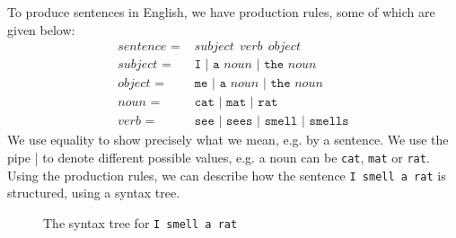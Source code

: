 \documentclass[a4paper, openany]{memoir}
\begin{document}
To produce sentences in English, we have production rules, some of which are given below:
\begin{align*}
    \textit{sentence } =& \textit{ subject} \ \ \textit{verb} \ \ \textit{object} \\
    \textit{subject } =& \texttt{ I } | \texttt{ a } \textit{noun } | \texttt{ the } \textit{noun } \\
    \textit{object } =& \texttt{ me } | \texttt{ a } \textit{noun } | \texttt{ the } \textit{noun } \\
    \textit{noun } =& \texttt{ cat } | \texttt{ mat } | \texttt{ rat} \\
    \textit{verb } =&  \texttt{ see } | \texttt{ sees } | \texttt{ smell } | \texttt{ smells}
\end{align*}
We use equality to show precisely what we mean, e.g. by a sentence. We use the pipe | to denote different possible values, e.g. a noun can be \texttt{cat}, \texttt{mat} or \texttt{rat}. Using the production rules, we can describe how the sentence \texttt{I smell a rat} 
is structured, using a syntax tree.
\begin{figure}[H]
    \centering
    \caption{The syntax tree for \texttt{I smell a rat}}
\end{figure}
\end{document}
